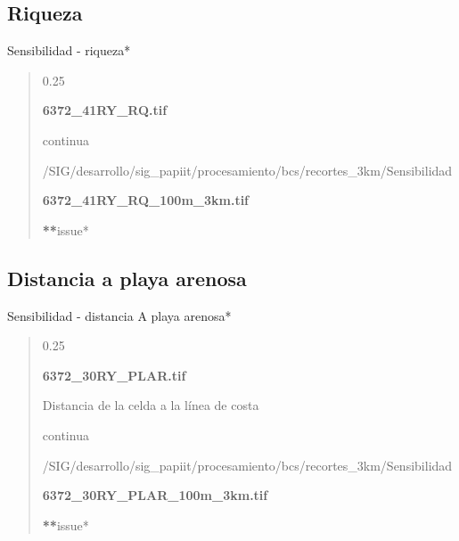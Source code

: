 \documentclass[letterpaper,10pt,spanish]{sphinxmanual}
\begin{document}
\subsection{Riqueza}
\label{\detokenize{sensibilidad_bcs:riqueza}}
Sensibilidad - riqueza*
\begin{quote}

 0.25

 {\color{red}\bfseries{}\textbar{}6372\_41RY\_RQ.tif\textbar{}}


 continua


 /SIG/desarrollo/sig\_papiit/procesamiento/bcs/recortes\_3km/Sensibilidad

  {\color{red}\bfseries{}\textbar{}6372\_41RY\_RQ\_100m\_3km.tif\textbar{}}

{\color{red}\bfseries{}**}issue* 
\end{quote}


\subsection{Distancia a playa arenosa}
\label{\detokenize{sensibilidad_bcs:distancia-a-playa-arenosa}}
Sensibilidad - distancia A playa arenosa*
\begin{quote}

 0.25

 {\color{red}\bfseries{}\textbar{}6372\_30RY\_PLAR.tif\textbar{}}

 Distancia de la celda a la línea de costa

 continua


 /SIG/desarrollo/sig\_papiit/procesamiento/bcs/recortes\_3km/Sensibilidad

  {\color{red}\bfseries{}\textbar{}6372\_30RY\_PLAR\_100m\_3km.tif\textbar{}}

{\color{red}\bfseries{}**}issue* \textbar{}\textbar{}
\end{quote}
\end{document}
